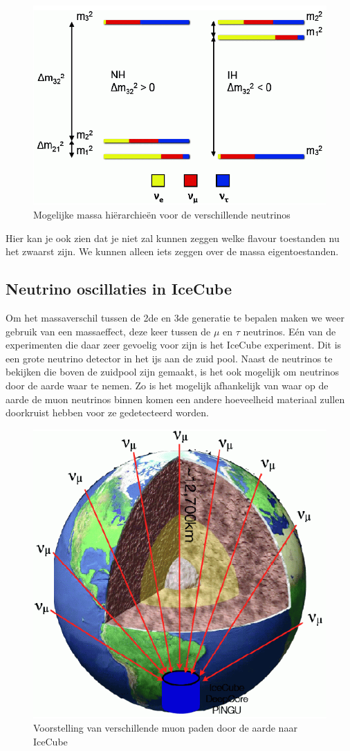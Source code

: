 \documentclass[../main.tex]{subfiles}
\begin{document}
\begin{figure}[h]
    \centering
    \includegraphics[width=0.5\linewidth]{neutrinos/massa_hier.png}
    \caption{Mogelijke massa hiërarchieën voor de verschillende neutrinos}%
    \label{fig:neutrinos/massa_hier}
\end{figure}

Hier kan je ook zien dat je niet zal kunnen zeggen welke flavour toestanden nu het zwaarst zijn. We kunnen alleen iets zeggen over de massa eigentoestanden.

\subsection{Neutrino oscillaties in IceCube}%
\label{sub:neutrino_oscillaties_in_icecube}

Om het massaverschil tussen de 2de en 3de generatie te bepalen maken we weer gebruik van een massaeffect, deze keer tussen de $\mu$ en $\tau$ neutrinos. Eén van de experimenten die daar zeer gevoelig voor zijn is het IceCube experiment. Dit is een grote neutrino detector in het ijs aan de zuid pool. Naast de neutrinos te bekijken die boven de zuidpool zijn gemaakt, is het ook mogelijk om neutrinos door de aarde waar te nemen. Zo is het mogelijk afhankelijk van waar op de aarde de muon neutrinos binnen komen een andere hoeveelheid materiaal zullen doorkruist hebben voor ze gedetecteerd worden.

\begin{figure}[h]
    \centering
    \includegraphics[width=0.3\linewidth]{neutrinos/icecube_voorstelling.png}
    \caption{Voorstelling van verschillende muon paden door de aarde naar IceCube}%
    \label{fig:neutrinos/icecube_voorstelling}
\end{figure}
\end{document}
